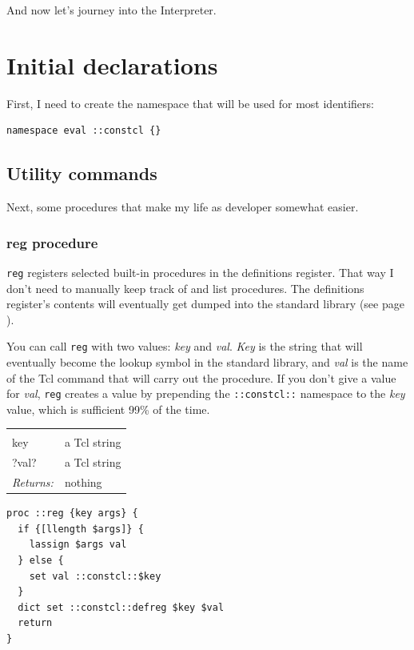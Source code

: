 \documentclass[twoside,9pt]{report}
\begin{document}
And now let's journey into the Interpreter.
\chapter{Initial declarations}
\label{initial-declarations}


First, I need to create the namespace that will be used for most identifiers:

\begin{lstlisting}
namespace eval ::constcl {}
\end{lstlisting}
\section{Utility commands}
\label{utility-commands}


Next, some procedures that make my life as developer somewhat easier.

\subsection{reg procedure}
\label{reg-procedure}


\texttt{reg} registers selected built-in procedures in the definitions register. That way I don't need to manually keep track of and list procedures. The definitions register's contents will eventually get dumped into the standard library (see page \pageref{environment-startup}).


You can call \texttt{reg} with two values: \emph{key} and \emph{val}. \emph{Key} is the string that will eventually become the lookup symbol in the standard library, and \emph{val} is the name of the Tcl command that will carry out the procedure. If you don't give a value for \emph{val}, \texttt{reg} creates a value by prepending the \texttt{::constcl::} namespace to the \emph{key} value, which is sufficient 99\% of the time.

\noindent\begin{tabular}{ |p{1.5cm} p{8cm}| }
\hline
\rowcolor[HTML]{CCCCCC} \multicolumn{2}{|l|}{\bf reg (internal)} \\
key & a Tcl string \\
?val? & a Tcl string \\
\textit{Returns:} & nothing \\
\hline
\end{tabular}
\begin{lstlisting}
proc ::reg {key args} {
  if {[llength $args]} {
    lassign $args val
  } else {
    set val ::constcl::$key
  }
  dict set ::constcl::defreg $key $val
  return
}
\end{lstlisting}
\end{document}
